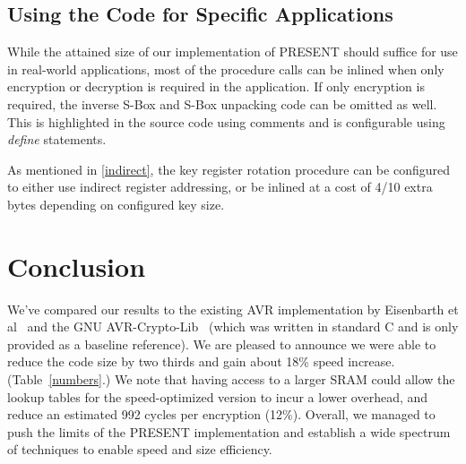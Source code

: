 \documentclass[11pt]{llncs2e} %
\begin{document}
\subsection{Using the Code for Specific Applications}
While the attained size of our implementation of PRESENT should suffice for use in real-world applications, most of the procedure calls can be inlined when only encryption or decryption is required in the application.
If only encryption is required, the inverse S-Box and  S-Box unpacking code can be omitted as well.
This is highlighted in the source code using comments and is configurable using \textit{define} statements.


As mentioned in \ref{indirect}, the key register rotation procedure can be configured to either use indirect register addressing, or be inlined at a cost of 4/10 extra bytes depending on configured key size.

\section{Conclusion}
We've compared our results to the existing AVR implementation by Eisenbarth et al~\cite{eisenbarth2012compact} and the GNU AVR-Crypto-Lib~\cite{avr_crypto_lib} (which was written in standard C and is only provided as a baseline reference).
We are pleased to announce we were able to reduce the code size by two thirds and gain about 18\% speed increase. (Table~\ref{numbers}.)
We note that having access to a larger SRAM could allow the lookup tables for the speed-optimized version to incur a lower overhead, and reduce an estimated 992 cycles per encryption (12\%). 
Overall, we managed to push the limits of the PRESENT implementation and establish a wide spectrum of techniques to enable speed and size efficiency.
\newcommand{\specialcell}[2][c]{%
  \begin{tabular}[#1]{@{}c@{}}#2\end{tabular}}
\end{document}
